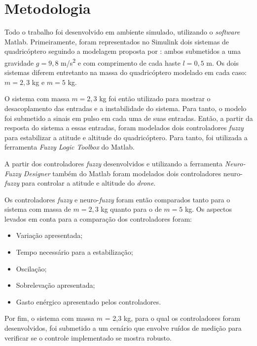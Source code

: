 \chapter{Metodologia}
\label{chap:metodologia}

Todo o trabalho foi desenvolvido em ambiente simulado, utilizando o \textit{software} Matlab\textsuperscript{\textregistered}. Primeiramente, foram representados no Simulink\textsuperscript{\textregistered} dois sistemas de quadricóptero seguindo a modelagem proposta por : ambos submetidos a uma gravidade $g = 9,8$ m/s\textsuperscript{2} e com comprimento de cada haste $l = 0,5$ m. Os dois sistemas diferem entretanto na massa do quadricóptero modelado em cada caso: $m = 2,3$ kg e $m = 5$ kg.

O sistema com massa $m = 2,3$ kg foi então utilizado para mostrar o desacoplamento das entradas e a instabilidade do sistema. Para tanto, o modelo foi submetido a sinais em pulso em cada uma de suas entradas. Então, a partir da resposta do sistema a essas entradas, foram modelados dois controladores \textit{fuzzy} para estabilizar a atitude e altitude do quadricóptero. Para tanto, foi utilizada a ferramenta \textit{Fuzzy Logic Toolbox} do Matlab\textsuperscript{\textregistered}.

A partir dos controladores \textit{fuzzy} desenvolvidos e utilizando a ferramenta \textit{Neuro-Fuzzy Designer} também do Matlab\textsuperscript{\textregistered} foram modelados dois controladores neuro-\textit{fuzzy} para controlar a atitude e altitude do \textit{drone}.

Os controladores \textit{fuzzy} e neuro-\textit{fuzzy} foram então comparados tanto para o sistema com massa de $m = 2,3$ kg quanto para o de $m = 5$ kg. Os aspectos levados em conta para a comparação dos controladores foram:
\begin{itemize}
	\item Variação apresentada;
	\item Tempo necessário para a estabilização;
	\item Oscilação;
	\item Sobrelevação apresentada;
	\item Gasto enérgico apresentado pelos controladores.
\end{itemize}

Por fim, o sistema com massa $m$ = 2,3 kg, para o qual os controladores foram desenvolvidos, foi submetido a um cenário que envolve ruídos de medição para verificar se o controle implementado se mostra robusto.
